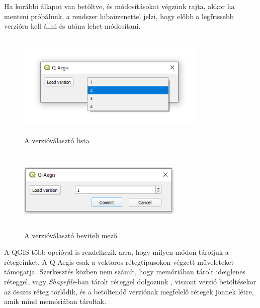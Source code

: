 Ha korábbi állapot van betöltve, és módosításokat végzünk rajta, akkor ha menteni próbálunk, a rendszer hibaüzenettel jelzi, hogy előbb a legfrissebb verzióra kell állni és utána lehet módosítani.
\begin{figure}[H]
	\centering
	\includegraphics[width=0.8\textwidth,height=190px]{images/version_combobox.png}
	\caption{A verzióválasztó lista}
	\label{fig:picture-4}
\end{figure}
\begin{figure}[H]
	\centering
	\includegraphics[width=0.7\textwidth,height=150px]{images/version_spinner.png}
	\caption{A verzióválasztó beviteli mező}
	\label{fig:picture-5}
\end{figure}

\begin{note}
A QGIS több opcióval is rendelkezik arra, hogy milyen módon tároljuk a rétegeinket. A Q-Aegis csak a vektoros rétegtípusokon végzett műveleteket támogatja. Szerkesztés közben nem számít, hogy memóriában tárolt ideiglenes réteggel, vagy \emph{Shapefile}-ban tárolt réteggel dolgozunk , viszont verzió betöltésekor az összes réteg törlődik, és a betöltendő verziónak megfelelő rétegek jönnek létre, amik mind memóriában tároltak.
\end{note}

